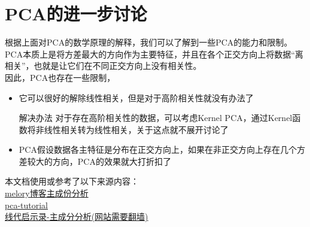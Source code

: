 \section{PCA的进一步讨论}
\begin{frame}
根据上面对PCA的数学原理的解释，我们可以了解到一些PCA的能力和限制。PCA本质上是将方差最大的方向作为主要特征，并且在各个正交方向上将数据“离相关”，也就是让它们在不同正交方向上没有相关性。\\
因此，PCA也存在一些限制，
\begin{itemize}
		 \item 它可以很好的解除线性相关，但是对于高阶相关性就没有办法了
		 \begin{block}{解决办法}
		 对于存在高阶相关性的数据，可以考虑Kernel PCA，通过Kernel函数将非线性相关转为线性相关，关于这点就不展开讨论了
		 \end{block}
	        \item PCA假设数据各主特征是分布在正交方向上，如果在非正交方向上存在几个方差较大的方向，PCA的效果就大打折扣了
	      
	
	\end{itemize}


\end{frame}


\begin{frame}
本文档使用或参考了以下来源内容：\\
\href{http://www.melory.me}{melory博客主成份分析}\\
\href{http://blog.codinglabs.org/articles/pca-tutorial.html}{pca-tutorial}\\
\href{https://ccjou.wordpress.com/2013/04/15/主成分分析}{线代启示录-主成分分析(网站需要翻墙)}
\end{frame}




